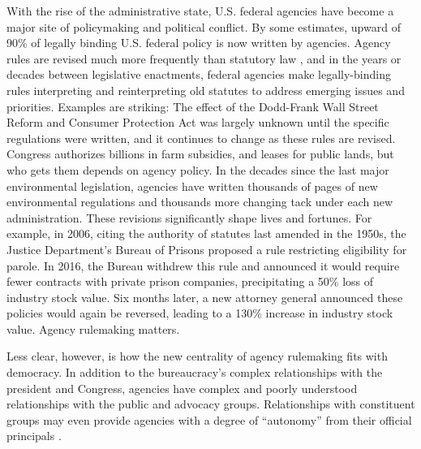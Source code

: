 \documentclass[
      12pt,
        ]{article}
\begin{document}
With the rise of the administrative state, U.S. federal agencies have
become a major site of policymaking and political conflict. By some
estimates, upward of 90\% of legally binding U.S. federal policy is now
written by agencies. Agency rules are revised much more frequently than
statutory law \citep{Wagner2017}, and in the years or decades between
legislative enactments, federal agencies make legally-binding rules
interpreting and reinterpreting old statutes to address emerging issues
and priorities. Examples are striking: The effect of the Dodd-Frank Wall
Street Reform and Consumer Protection Act was largely unknown until the
specific regulations were written, and it continues to change as these
rules are revised. Congress authorizes billions in farm subsidies, and
leases for public lands, but who gets them depends on agency policy. In
the decades since the last major environmental legislation, agencies
have written thousands of pages of new environmental regulations and
thousands more changing tack under each new administration. These
revisions significantly shape lives and fortunes. For example, in 2006,
citing the authority of statutes last amended in the 1950s, the Justice
Department's Bureau of Prisons proposed a rule restricting eligibility
for parole. In 2016, the Bureau withdrew this rule and announced it
would require fewer contracts with private prison companies,
precipitating a 50\% loss of industry stock value. Six months later, a
new attorney general announced these policies would again be reversed,
leading to a 130\% increase in industry stock value. Agency rulemaking
matters.

Less clear, however, is how the new centrality of agency rulemaking fits
with democracy. In addition to the bureaucracy's complex relationships with
the president and Congress, agencies have complex and poorly understood
relationships with the public and advocacy groups. Relationships with
constituent groups may even provide agencies with a degree of ``autonomy'' from their official principals \citep{Carpenter2001}.
\end{document}
